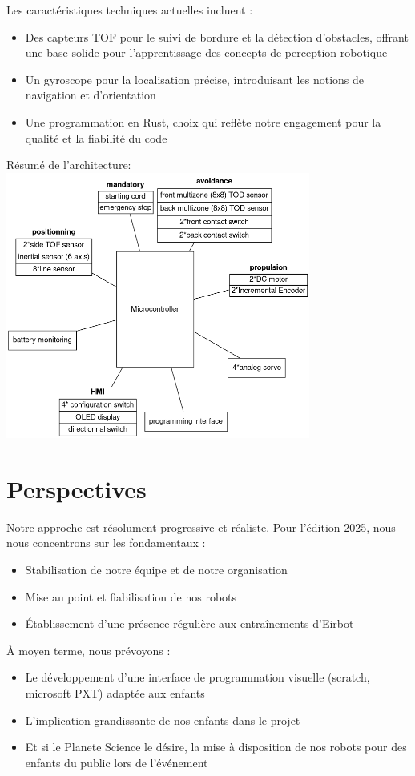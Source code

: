 \documentclass{article}
\begin{document}
Les caractéristiques techniques actuelles incluent :
\begin{itemize}
    \item Des capteurs TOF pour le suivi de bordure et la détection d'obstacles, offrant une base solide pour l'apprentissage des concepts de perception robotique
    \item Un gyroscope pour la localisation précise, introduisant les notions de navigation et d'orientation
    \item Une programmation en Rust, choix qui reflète notre engagement pour la qualité et la fiabilité du code
\end{itemize}

Résumé de l'architecture:\\
\includegraphics[width = 10cm]{projet_scientifique_technique_2025}

\section{Perspectives}

Notre approche est résolument progressive et réaliste. Pour l'édition 2025, nous nous concentrons sur les fondamentaux :
\begin{itemize}
    \item Stabilisation de notre équipe et de notre organisation
    \item Mise au point et fiabilisation de nos robots
    \item Établissement d'une présence régulière aux entraînements d'Eirbot
\end{itemize}

À moyen terme, nous prévoyons :
\begin{itemize}
    \item Le développement d'une interface de programmation visuelle (scratch, microsoft PXT) adaptée aux enfants
    \item L'implication grandissante de nos enfants dans le projet
    \item Et si le Planete Science le désire, la mise à disposition de nos robots pour des enfants du public lors de l'événement
\end{itemize}
\end{document}
